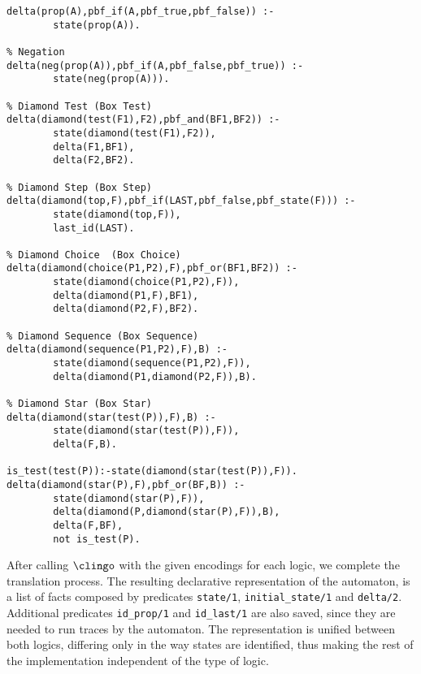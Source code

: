 \begin{center}
    \begin{lstlisting}[] 
% Proposition
delta(prop(A),pbf_if(A,pbf_true,pbf_false)) :- 
        state(prop(A)).

% Negation
delta(neg(prop(A)),pbf_if(A,pbf_false,pbf_true)) :- 
        state(neg(prop(A))).

% Diamond Test (Box Test)
delta(diamond(test(F1),F2),pbf_and(BF1,BF2)) :- 
        state(diamond(test(F1),F2)), 
        delta(F1,BF1), 
        delta(F2,BF2).

% Diamond Step (Box Step)
delta(diamond(top,F),pbf_if(LAST,pbf_false,pbf_state(F))) :- 
        state(diamond(top,F)),
        last_id(LAST).

% Diamond Choice  (Box Choice)
delta(diamond(choice(P1,P2),F),pbf_or(BF1,BF2)) :- 
        state(diamond(choice(P1,P2),F)),
        delta(diamond(P1,F),BF1), 
        delta(diamond(P2,F),BF2).

% Diamond Sequence (Box Sequence)
delta(diamond(sequence(P1,P2),F),B) :- 
        state(diamond(sequence(P1,P2),F)),
        delta(diamond(P1,diamond(P2,F)),B).

% Diamond Star (Box Star)
delta(diamond(star(test(P)),F),B) :- 
        state(diamond(star(test(P)),F)), 
        delta(F,B).

is_test(test(P)):-state(diamond(star(test(P)),F)).
delta(diamond(star(P),F),pbf_or(BF,B)) :- 
        state(diamond(star(P),F)),
        delta(diamond(P,diamond(star(P),F)),B),
        delta(F,BF),
        not is_test(P).
\end{lstlisting}
\end{center}


After calling $\clingo$ with the given encodings for each logic, we complete the translation process. The resulting declarative representation of the automaton, is a list of facts composed by predicates \texttt{state/1}, \texttt{initial\_state/1} and \texttt{delta/2}. Additional predicates \texttt{id\_prop/1} and \texttt{id\_last/1} are also saved, since they are needed to run traces by the automaton. The representation is unified between both logics, differing only in the way states are identified, thus making the rest of the implementation independent of the type of logic. 

